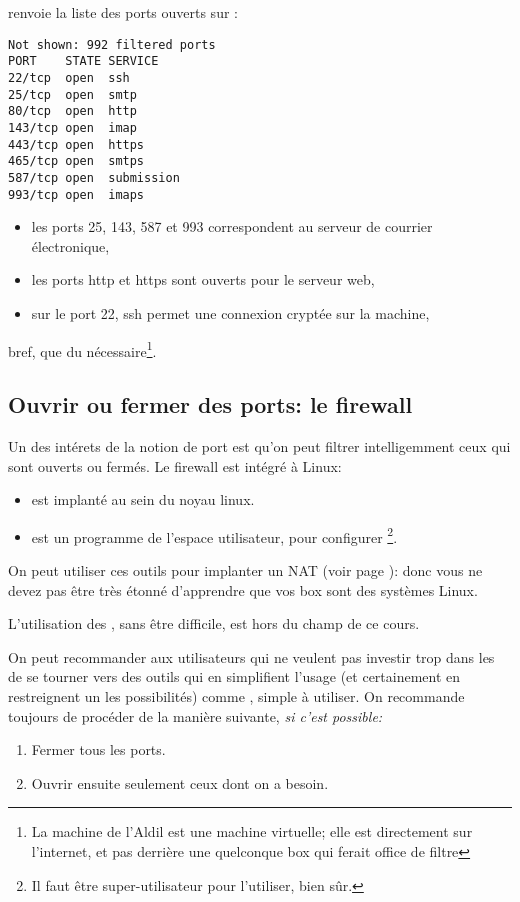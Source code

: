 
renvoie la liste des ports ouverts sur  :

\begin{verbatim}
Not shown: 992 filtered ports
PORT    STATE SERVICE
22/tcp  open  ssh
25/tcp  open  smtp
80/tcp  open  http
143/tcp open  imap
443/tcp open  https
465/tcp open  smtps
587/tcp open  submission
993/tcp open  imaps
\end{verbatim}



\begin{itemize}
\item les ports 25, 143, 587 et 993 correspondent au serveur de
  courrier électronique,
\item les ports http et https sont ouverts pour le serveur web,
\item sur le port 22, ssh permet une connexion cryptée sur la machine,
\end{itemize}

bref, que du nécessaire\footnote{La machine de l'Aldil est une machine
  virtuelle; elle est directement sur l'internet, et pas derrière une
  quelconque box qui ferait office de filtre}.

\subsection{Ouvrir ou fermer des ports: le firewall} \label{firewall}
Un des intérets de 
la notion de port est qu'on peut filtrer intelligemment ceux qui sont
ouverts ou fermés. Le firewall est intégré à Linux:
\begin{itemize}
  \item {}\cite{netfilter} est implanté au sein du noyau
    linux.
  \item {}\cite{iptables} est un programme de l'espace
    utilisateur, pour configurer \footnote{Il
      faut être super-utilisateur pour l'utiliser, bien sûr.}.
\end{itemize}

On peut utiliser ces outils pour implanter un NAT (voir page
\pageref{nat}): donc vous ne devez pas être très étonné d'apprendre que
vos \og box\fg{} sont des systèmes Linux.

L'utilisation des  , sans être difficile, est hors du
champ de ce cours.

On peut recommander aux utilisateurs qui ne veulent pas investir trop
dans les   de se tourner vers des outils qui en
simplifient l'usage (et certainement en restreignent un les
possibilités) comme \cite{ufw}, simple à utiliser. On
recommande toujours de procéder de la manière suivante, \emph{si c'est
possible:}
\begin{enumerate}
\item Fermer tous les ports.
\item Ouvrir ensuite seulement ceux dont on a besoin.
\end{enumerate}
